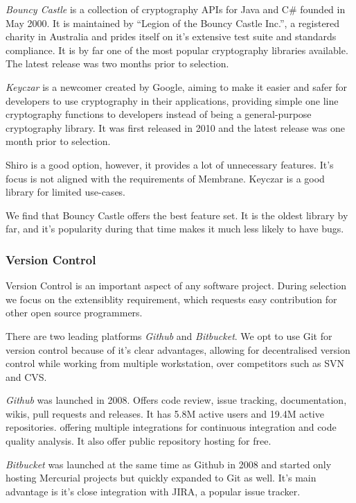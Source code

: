\documentclass[11pt, a4paper, twoside]{report}
\begin{document}
\emph{Bouncy Castle} is a collection of cryptography APIs for Java and C\# founded in May 2000. It is maintained by ``Legion of the Bouncy Castle Inc.'', a registered charity in Australia and prides itself on it's extensive test suite and standards compliance. It is by far one of the most popular cryptography libraries available. \citep{bouncy2017castle} The latest release was two months prior to selection.

\emph{Keyczar} is a newcomer created by Google, aiming to make it easier and safer for developers to use cryptography in their applications, providing simple one line cryptography functions to developers instead of being a general-purpose cryptography library. It was first released in 2010 and the latest release was one month prior to selection. \citep{keyczar2017github}

Shiro is a good option, however, it provides a lot of unnecessary features. It's focus is not aligned with the requirements of Membrane. Keyczar is a good library for limited use-cases.

We find that Bouncy Castle offers the best feature set. It is the oldest library by far, and it's popularity during that time makes it much less likely to have bugs.

\subsubsection{Version Control} \label{sec:versionControl}

Version Control is an important aspect of any software project. During selection we focus on the extensiblity requirement, which requests easy contribution for other open source programmers.

There are two leading platforms \emph{Github} and \emph{Bitbucket}. We opt to use Git for version control because of it's clear advantages, allowing for decentralised version control while working from multiple workstation, over competitors such as SVN and CVS.

\emph{Github} was launched in 2008. Offers code review, issue tracking, documentation, wikis, pull requests and releases. It has 5.8M active users and 19.4M active repositories. \citep{github2016octoverse} offering multiple integrations for continuous integration and code quality analysis. It also offer public repository hosting for free.

\emph{Bitbucket} was launched at the same time as Github in 2008 and started only hosting Mercurial projects but quickly expanded to Git as well. \citep{bitbucket2017site} It's main advantage is it's close integration with JIRA, a popular issue tracker. \citep{upguard2014gitvbit}
\end{document}
